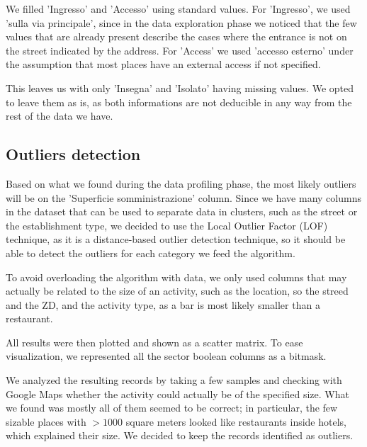 \documentclass{article}
\begin{document}
We filled 'Ingresso' and 'Accesso' using standard values. For 'Ingresso', we used 'sulla via principale', since in the data exploration phase we noticed that the few values that are already present describe the cases where the entrance is not on the street indicated by the address. For 'Access' we used 'accesso esterno' under the assumption that most places have an external access if not specified.

This leaves us with only 'Insegna' and 'Isolato' having missing values. We opted to leave them as is, as both informations are not deducible in any way from the rest of the data we have.

\subsection{Outliers detection}
Based on what we found during the data profiling phase, the most likely outliers will be on the 'Superficie somministrazione' column. Since we have many columns in the dataset that can be used to separate data in clusters, such as the street or the establishment type, we decided to use the Local Outlier Factor (LOF) technique, as it is a distance-based outlier detection technique, so it should be able to detect the outliers for each category we feed the algorithm. 

To avoid overloading the algorithm with data, we only used columns that may actually be related to the size of an activity, such as the location, so the streed and the ZD, and the activity type, as a bar is most likely smaller than a restaurant.

All results were then plotted and shown as a scatter matrix. To ease visualization, we represented all the sector boolean columns as a bitmask.

We analyzed the resulting records by taking a few samples and checking with Google Maps whether the activity could actually be of the specified size. What we found was mostly all of them seemed to be correct; in particular, the few sizable places with $>1000$ square meters looked like restaurants inside hotels, which explained their size. We decided to keep the records identified as outliers.
\end{document}
